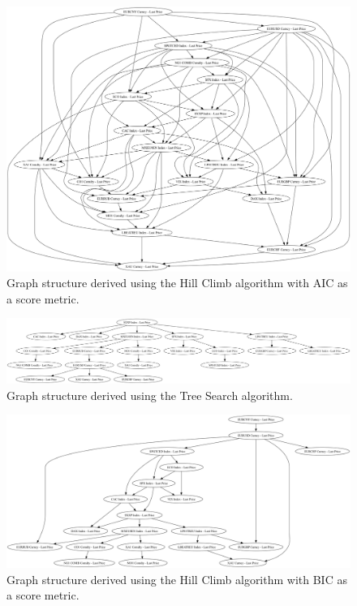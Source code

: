 \documentclass[12pt, letterpaper]{article}
\begin{document}
\begin{figure}[ht]
\centering
\includegraphics[width=\textwidth, keepaspectratio]{graphics/HCAICv3.png}
\caption{Graph structure derived using the Hill Climb algorithm with AIC as a score metric.}
\label{fig:netaic}
\end{figure}

\begin{figure}[ht]
\centering
\includegraphics[width=1\textwidth]{graphics/TreeSChowLiu.png}
\caption{Graph structure derived using the Tree Search algorithm.}
\label{fig:nettreesearch}
\end{figure}

\begin{figure}[ht]
\centering
\includegraphics[width=1\textwidth]{graphics/HCBICTabu100v2.png}
\caption{Graph structure derived using the Hill Climb algorithm with BIC as a score metric.}
\label{fig:netbic}
\end{figure}
\end{document}
